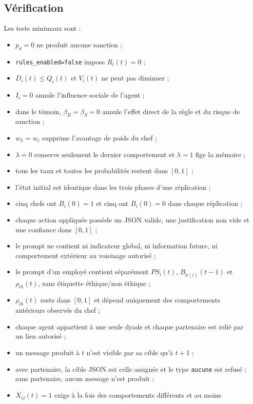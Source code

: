 \documentclass[10pt,a4paper]{article}
\newcommand{\code}[1]{\texttt{\small #1}}
\begin{document}
\subsection{Vérification}

Les tests minimaux sont :

\begin{itemize}
  \item $p_d=0$ ne produit aucune sanction ;
  \item \code{rules\_enabled=false} impose $R_i(t)=0$ ;
  \item $D_i(t)\leq Q_i(t)$ et $V_i(t)$ ne peut pas diminuer ;
  \item $I_i=0$ annule l’influence sociale de l’agent ;
  \item dans le témoin, $\beta_R=\beta_S=0$ annule l’effet direct de la règle
  et du risque de sanction ;
  \item $w_h=w_c$ supprime l’avantage de poids du chef ;
  \item $\lambda=0$ conserve seulement le dernier comportement et
  $\lambda=1$ fige la mémoire ;
  \item tous les taux et toutes les probabilités restent dans $[0,1]$ ;
  \item l’état initial est identique dans les trois phases d’une réplication ;
  \item cinq chefs ont $B_i(0)=1$ et cinq ont $B_i(0)=0$ dans chaque
  réplication ;
  \item chaque action appliquée possède un JSON valide, une justification non
  vide et une confiance dans $[0,1]$ ;
  \item le prompt ne contient ni indicateur global, ni information future, ni
  comportement extérieur au voisinage autorisé ;
  \item le prompt d’un employé contient séparément $PS_i(t)$,
  $B_{h(i)}(t-1)$ et $\rho_{ih}(t)$, sans étiquette éthique/non éthique ;
  \item $\rho_{ih}(t)$ reste dans $[0,1]$ et dépend uniquement des
  comportements antérieurs observés du chef ;
  \item chaque agent appartient à une seule dyade et chaque partenaire est
  relié par un lien autorisé ;
  \item un message produit à $t$ n’est visible par sa cible qu’à $t+1$ ;
  \item avec partenaire, la cible JSON est celle assignée et le type
  \code{aucune} est refusé ; sans partenaire, aucun message n’est produit ;
  \item $X_{ij}(t)=1$ exige à la fois des comportements différents et au moins

\end{itemize}
\end{document}
